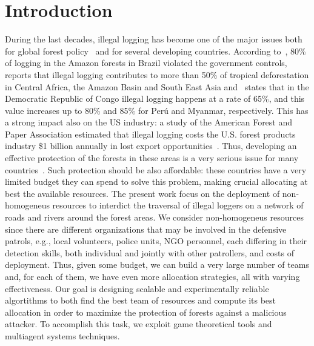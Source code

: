 \section{Introduction}\label{sec:introduction}
During the last decades, illegal logging has become one of the major issues both for global forest policy~\cite{tacconi2012illegal} and for several developing countries. According to~\cite{toyne2002timber}, 80\% of logging in the Amazon forests in Brazil violated the government controls, \cite{nellemann2012green} reports that illegal logging contributes to more than 50\% of tropical deforestation in Central Africa, the Amazon Basin and South East Asia and~\cite{wwf15illegal} states that in the Democratic Republic of Congo illegal logging happens at a rate of 65\%, and this value increases up to 80\% and 85\% for Per\'{u} and Myanmar, respectively. This has a strong impact also on the US industry: a study of the American Forest and Paper Association estimated that illegal logging costs the U.S. forest products industry \$1 billion annually in lost export opportunities~\cite{afpa16illegal}. Thus, developing an effective protection of the forests in these areas is a very serious issue for many countries~\cite{allnutt2013mapping,dhital2015issues}. Such protection should be also affordable: these countries have a very limited budget they can spend to solve this problem, making crucial allocating at best the available resources. The present work focus on the deployment of non-homogeneus resources to interdict the traversal of illegal loggers on a network of roads and rivers around the forest areas. We consider non-homogeneus resources since there are different organizations that may be involved in the defensive patrols, e.g., local volunteers, police units, NGO personnel, each differing in their detection skills, both individual and jointly with other patrollers, and costs of deployment. Thus, given some budget, we can build a very large number of teams and, for each of them, we have even more allocation strategies, all with varying effectiveness. Our goal is designing scalable and experimentally reliable algortithms to both find the best team of resources and compute its best allocation in order to maximize the protection of forests against a malicious attacker. To accomplish this task, we exploit game theoretical tools and multiagent systems techniques.

